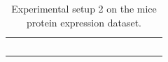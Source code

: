 \documentclass{tufte-book}
\begin{document}
\begin{Definition}
\begin{table}[]
\begin{tabular}{cccccccccccccccc}
                        &                                                                                               &                             &                                       &                             &                                       &                             &                                       &                             &                                       &                             &                                       &  &  &  &  \\
                        &                                                                                               &                             &                                       &                             &                                       &                             &                                       &                             &                                       &                             &                                       &  &  &  &  \\
                        &                                                                                               &                             &                                       &                             &                                       &                             &                                       &                             &                                       &                             &                                       &  &  &  &  \\
                        &                                                                                               &                             &                                       &                             &                                       &                             &                                       &                             &                                       &                             &                                       &  &  &  &  \\
                        &                                                                                               &                             &                                       &                             &                                       &                             &                                       &                             &                                       &                             &                                       &  &  &  & 
\caption{Experimental setup 2 on the mice protein expression dataset.}
			\end{tabular}
\end{table}




\end{Definition}
\end{document}
